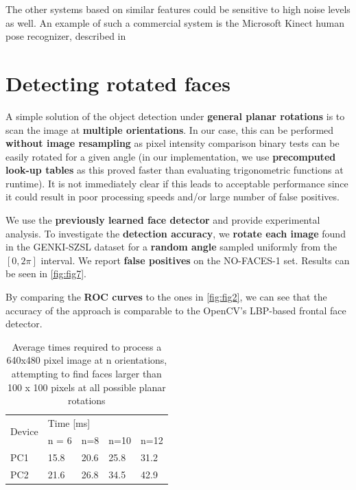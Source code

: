 \documentclass[a4paper,12pt]{article}
\begin{document}
The other systems based on similar features could be sensitive to high noise levels as well. An example of such a commercial system is the Microsoft Kinect human pose recognizer, described in

\section{Detecting rotated faces}
A simple solution of the object detection under \textbf{general planar rotations} is to scan the
image at \textbf{multiple orientations}. In our case, this can be performed
\textbf{without image resampling} as pixel intensity comparison binary tests can be easily rotated for a given angle (in our implementation, we use \textbf{precomputed look-up tables} as this
proved faster than evaluating trigonometric functions at runtime).
It is not immediately clear if this leads to acceptable
performance since it could result in poor processing speeds and/or large number of false positives.

We use the \textbf{previously learned face detector} and provide experimental analysis.
To investigate the \textbf{detection accuracy}, we \textbf{rotate each image} found in the GENKI-SZSL dataset
for a \textbf{random angle} sampled uniformly from the $[0, 2\pi]$ interval.
We report \textbf{false positives} on the NO-FACES-1 set. Results can be seen in \autoref{fig:fig7}.

By comparing the \textbf{ROC curves} to the ones in \autoref{fig:fig2},
we can see that the accuracy of the approach is comparable to the OpenCV's LBP-based frontal face detector.

\begin{table}[hb]
\begin{tabular}{|l|l|l|l|l|}
\hline
\multirow{2}{*}{Device} & \multicolumn{4}{l|}{Time {[}ms{]}} \\ \cline{2-5}
                        & n = 6   & n=8    & n=10   & n=12   \\ \hline
PC1                     & 15.8    & 20.6   & 25.8   & 31.2   \\ \hline
PC2                     & 21.6    & 26.8   & 34.5   & 42.9   \\ \hline
\end{tabular}
\caption{Average times required to process a 640x480 pixel image at n orientations, attempting to find faces larger than 100 x 100 pixels at all possible planar rotations}
\label{tab:table3}
\end{table}
\end{document}
